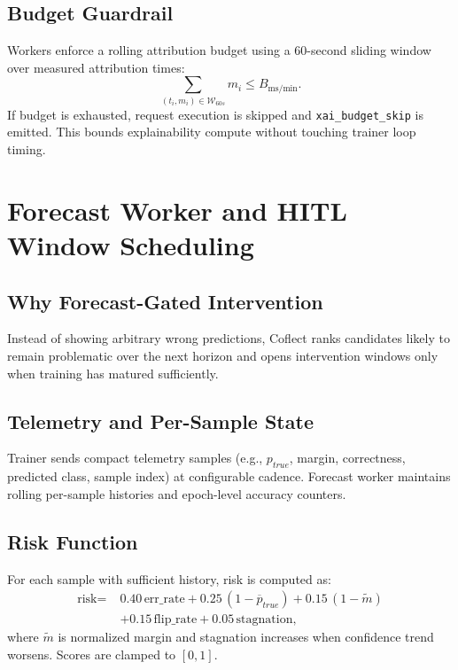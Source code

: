 \documentclass[11pt]{article}
\begin{document}
\subsection{Budget Guardrail}
Workers enforce a rolling attribution budget using a 60-second sliding window over measured attribution times:
\begin{equation}
\sum_{(t_i,m_i)\in\mathcal{W}_{60s}} m_i \leq B_{\text{ms/min}}.
\end{equation}
If budget is exhausted, request execution is skipped and \texttt{xai\_budget\_skip} is emitted.
This bounds explainability compute without touching trainer loop timing.

\section{Forecast Worker and HITL Window Scheduling}
\subsection{Why Forecast-Gated Intervention}
Instead of showing arbitrary wrong predictions, Coflect ranks candidates likely to remain problematic over the next horizon and opens intervention windows only when training has matured sufficiently.

\subsection{Telemetry and Per-Sample State}
Trainer sends compact telemetry samples (e.g., \(p_{true}\), margin, correctness, predicted class, sample index) at configurable cadence.
Forecast worker maintains rolling per-sample histories and epoch-level accuracy counters.

\subsection{Risk Function}
For each sample with sufficient history, risk is computed as:
\begin{equation}
\begin{aligned}
\text{risk} =\;&0.40\,\text{err\_rate}
+0.25\,(1-\overline{p}_{true})
+0.15\,(1-\widetilde{m}) \\
&+0.15\,\text{flip\_rate}
+0.05\,\text{stagnation},
\end{aligned}
\end{equation}
where \(\widetilde{m}\) is normalized margin and stagnation increases when confidence trend worsens.
Scores are clamped to \([0,1]\).
\end{document}
